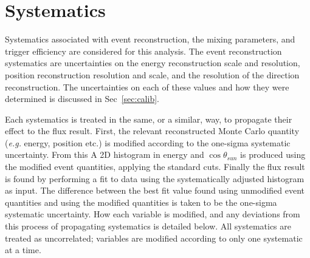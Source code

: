 \section{Systematics}
\label{sec:systematics}
Systematics associated with event reconstruction, the mixing parameters,
and trigger efficiency are considered for this analysis.
The event reconstruction systematics are uncertainties on the energy reconstruction
scale and resolution, position reconstruction resolution and scale, and the
resolution of the direction reconstruction.
The uncertainties on each of these values and how they were determined is
discussed in Sec~\ref{sec:calib}.

Each systematics is treated in the same, or a similar, way, to propagate
their effect to the flux result.
First, the relevant reconstructed Monte Carlo quantity (\textit{e.g.} energy, position etc.)
is modified according to the one-sigma systematic uncertainty.
From this A 2D histogram in energy and $\cos\theta_{sun}$ is produced using the
modified event quantities, applying the standard cuts.
Finally the flux result is found by performing a fit to data using the systematically
adjusted histogram as input.
The difference between the best fit value found using unmodified event quantities
and using the modified quantities is taken to be the one-sigma systematic uncertainty.
How each variable is modified, and any deviations from this process of
propagating systematics is detailed below.
All systematics are treated as uncorrelated; variables are modified according to
only one systematic at a time.

